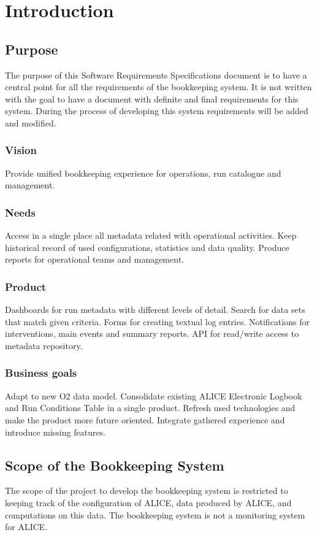 \chapter{Introduction}

 
\section{Purpose}
The purpose of this Software Requirements Specifications document is to have a central point for all the requirements of the bookkeeping system. It is not written with the goal to have a document with definite and final requirements for this system. During the process of developing this system requirements will be added and modified.

\subsection{Vision}
Provide unified bookkeeping experience for operations, run catalogue and management.

\subsection{Needs}
Access in a single place all metadata related with operational activities. Keep historical record of used configurations, statistics and data quality. Produce reports for operational teams and management. 

\subsection{Product}
Dashboards for run metadata with different levels of detail. Search for data sets that match given criteria. Forms for creating textual log entries. Notifications for interventions, main events and summary reports. API for read/write access to metadata repository. 


\subsection{Business goals}
Adapt to new O2 data model. Consolidate existing ALICE Electronic Logbook and Run Conditions Table in a single product. Refresh used technologies and make the product more future oriented. Integrate gathered experience and introduce missing features. 



\section{Scope of the Bookkeeping System}
The scope of the project to develop the bookkeeping system is restricted to keeping track of the configuration of ALICE, data produced by ALICE, and computations on this data. The bookkeeping system is not a monitoring system for ALICE.

